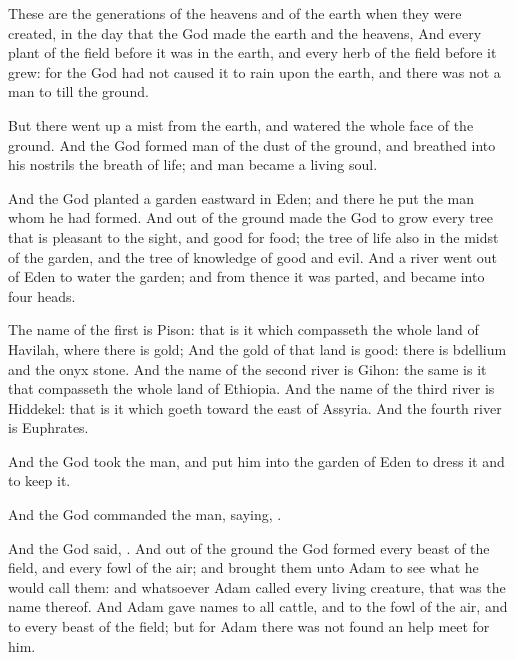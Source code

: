 \verse These are the generations of the heavens and of the earth when they were created, in the day that the \LORD God made the earth and the heavens,
\verse And every plant of the field before it was in the earth, and every herb of the field before it grew: for the \LORD God had not caused it to rain upon the earth, and there was not a man to till the ground.

\verse But there went up a mist from the earth, and watered the whole face of the ground.
\verse And the \LORD God formed man of the dust of the ground, and breathed into his nostrils the breath of life; and man became a living soul.

\verse And the \LORD God planted a garden eastward in Eden; and there he put the man whom he had formed.
\verse And out of the ground made the \LORD God to grow every tree that is pleasant to the sight, and good for food; the tree of life also in the midst of the garden, and the tree of knowledge of good and evil.
\verse And a river went out of Eden to water the garden; and from thence it was parted, and became into four heads.

\verse The name of the first is Pison: that is it which compasseth the whole land of Havilah, where there is gold; 
\verse And the gold of that land is good: there is bdellium and the onyx stone.
\verse And the name of the second river is Gihon: the same is it that compasseth the whole land of Ethiopia.
\verse And the name of the third river is Hiddekel: that is it which goeth toward the east of Assyria.  And the fourth river is Euphrates.

\verse And the \LORD God took the man, and put him into the garden of Eden to dress it and to keep it.

\verse And the \LORD God commanded the man, saying, .

\verse And the \LORD God said, .
\verse And out of the ground the \LORD God formed every beast of the field, and every fowl of the air; and brought them unto Adam to see what he would call them: and whatsoever Adam called every living creature, that was the name thereof.
\verse And Adam gave names to all cattle, and to the fowl of the air, and to every beast of the field; but for Adam there was not found an help meet for him.

